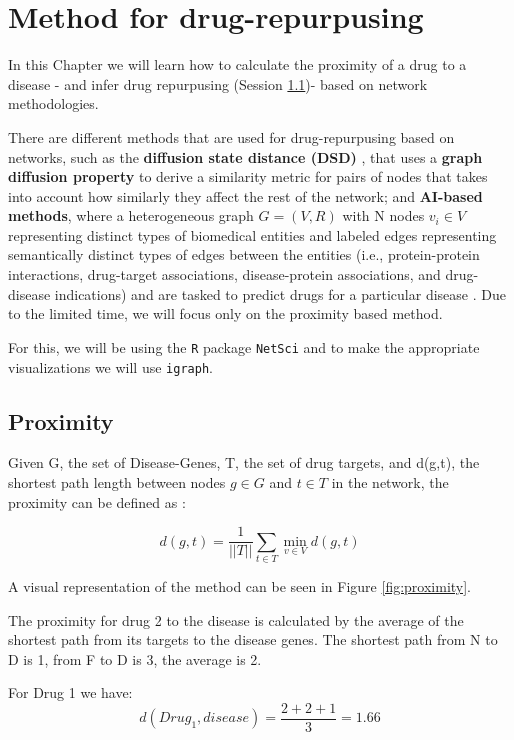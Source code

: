 \documentclass[
]{book}
\begin{document}
\hypertarget{method-for-drug-repurpusing}{%
\chapter{Method for drug-repurpusing}\label{method-for-drug-repurpusing}}

In this Chapter we will learn how to calculate the proximity of a drug to a disease - and infer drug repurpusing (Session \ref{proximity})- based on network methodologies.

There are different methods that are used for drug-repurpusing based on networks, such as the \textbf{diffusion state distance (DSD)} \citep{Cao2013}, that uses a \textbf{graph diffusion property} to derive a similarity metric for pairs of nodes that takes into account how similarly they affect the rest of the network; and \textbf{AI-based methods}, where a heterogeneous graph \(G = (V,R)\) with N nodes \(v_i \in V\) representing distinct types of biomedical entities and labeled edges representing semantically distinct types of edges between the entities (i.e., protein-protein interactions, drug-target associations, disease-protein associations, and drug-disease indications) and are tasked to predict drugs for a particular disease \citep{Zitnik2018}. Due to the limited time, we will focus only on the proximity based method.

For this, we will be using the \texttt{R} package \texttt{NetSci} and to make the appropriate visualizations we will use \texttt{igraph}.

\hypertarget{proximity}{%
\section{Proximity}\label{proximity}}

Given G, the set of Disease-Genes, T, the set of drug targets, and d(g,t), the shortest path length between nodes \(g \in G\) and \(t \in T\) in the network, the proximity can be defined as \citep{Guney2016}:

\[ 
d(g,t)  = \frac{1}{|\left|T\right||}\sum_{t\in T}\underset{v\in V}\min{d(g,t)}
\]

A visual representation of the method can be seen in Figure \ref{fig:proximity}.

The proximity for drug 2 to the disease is calculated by the average of the shortest path from its targets to the disease genes. The shortest path from N to D is 1, from F to D is 3, the average is 2.

For Drug 1 we have: \[d(Drug_1, disease) = \frac{2 + 2 + 1}{3} = 1.66\]
\end{document}
